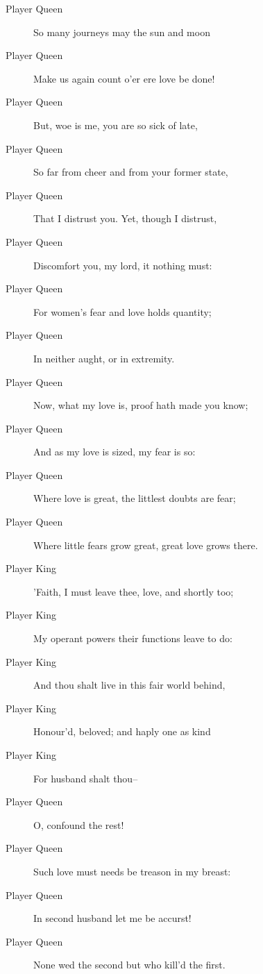 \documentclass{article}
\begin{document}
\begin{description}
            
\item[Player Queen] So many journeys may the sun and moon
\item[Player Queen] Make us again count o'er ere love be done!
\item[Player Queen] But, woe is me, you are so sick of late,
\item[Player Queen] So far from cheer and from your former state,
\item[Player Queen] That I distrust you. Yet, though I distrust,
\item[Player Queen] Discomfort you, my lord, it nothing must:
\item[Player Queen] For women's fear and love holds quantity;
\item[Player Queen] In neither aught, or in extremity.
\item[Player Queen] Now, what my love is, proof hath made you know;
\item[Player Queen] And as my love is sized, my fear is so:
\item[Player Queen] Where love is great, the littlest doubts are fear;
\item[Player Queen] Where little fears grow great, great love grows there.
\end{description}
          
\begin{description}
            
\item[Player King] 'Faith, I must leave thee, love, and shortly too;
\item[Player King] My operant powers their functions leave to do:
\item[Player King] And thou shalt live in this fair world behind,
\item[Player King] Honour'd, beloved; and haply one as kind
\item[Player King] For husband shalt thou--
\end{description}
          
\begin{description}
            
\item[Player Queen] O, confound the rest!
\item[Player Queen] Such love must needs be treason in my breast:
\item[Player Queen] In second husband let me be accurst!
\item[Player Queen] None wed the second but who kill'd the first.
\end{description}
          
\end{document}
